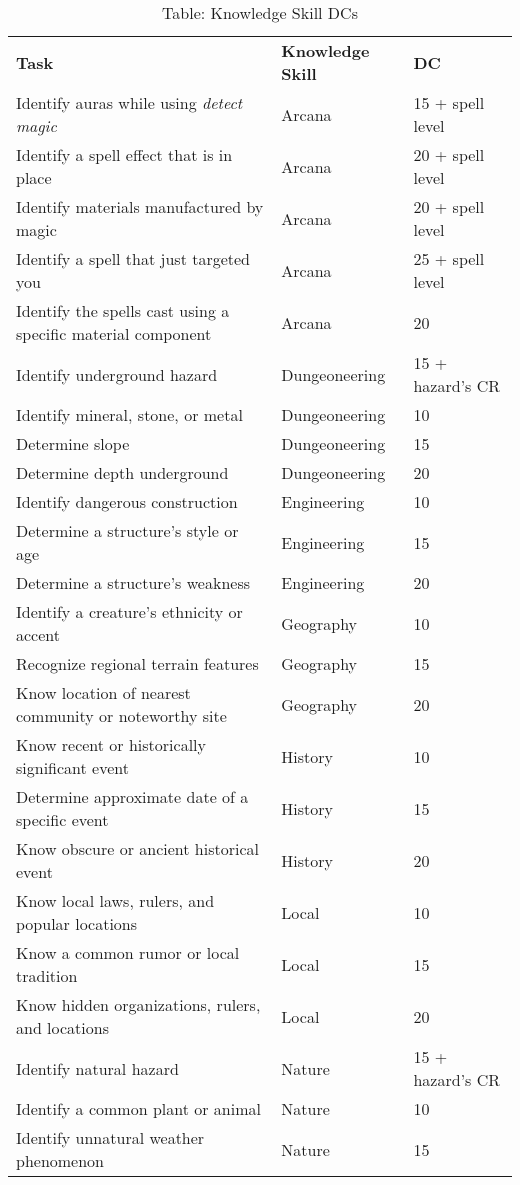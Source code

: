 \begin{table*}[]
\sffamily
\caption{Table: Knowledge Skill DCs}
\begin{tabular}{lll}
\textbf{Task} & \textbf{Knowledge Skill} & \textbf{DC}\\
Identify auras while using \textit{detect magic} & Arcana & 15 + spell level \\
Identify a spell effect that is in place & Arcana & 20 + spell level \\
Identify materials manufactured by magic & Arcana & 20 + spell level \\
Identify a spell that just targeted you &  Arcana & 25 + spell level \\ 
Identify the spells cast using a specific material component& Arcana& 20 \\ 
Identify underground hazard& Dungeoneering& 15 + hazard's CR \\
Identify mineral, stone, or metal& Dungeoneering& 10 \\
Determine slope& Dungeoneering& 15 \\
Determine depth underground& Dungeoneering& 20 \\
Identify dangerous construction& Engineering& 10 \\
Determine a structure's style or age& Engineering& 15 \\
Determine a structure's weakness& Engineering& 20 \\
Identify a creature's ethnicity or accent& Geography& 10 \\
Recognize regional terrain features& Geography& 15 \\
Know location of nearest community or noteworthy site& Geography& 20 \\
Know recent or historically significant event& History& 10 \\
Determine approximate date of a specific event& History& 15 \\
Know obscure or ancient historical event& History& 20 \\
Know local laws, rulers, and popular locations& Local& 10 \\ 
Know a common rumor or local tradition& Local& 15 \\
Know hidden organizations, rulers, and locations& Local& 20 \\
Identify natural hazard& Nature& 15 + hazard's CR \\ 
Identify a common plant or animal& Nature& 10 \\
Identify unnatural weather phenomenon& Nature& 15 \\

\end{tabular}
\end{table*}
